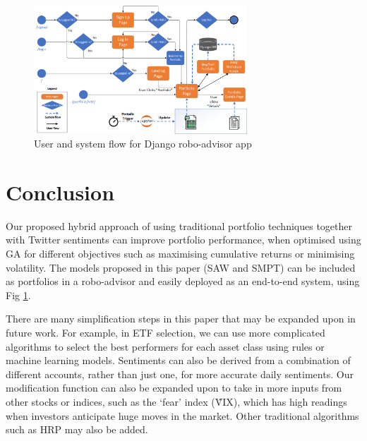 \documentclass{article}
\begin{document}
\begin{figure}[htbp]
    \includegraphics[width=8cm]{figure_django_architecture.png}
    \caption{User and system flow for Django robo-advisor app\label{figure_django}}
\end{figure}

\section{Conclusion}
\label{sec:conclusions}

Our proposed hybrid approach of using traditional portfolio techniques together with Twitter sentiments can improve portfolio performance, when optimised using GA for different objectives such as maximising cumulative returns or minimising volatility. The models proposed in this paper (SAW and SMPT) can be included as portfolios in a robo-advisor and easily deployed as an end-to-end system, using Fig \ref{figure_django}.

There are many simplification steps in this paper that may be expanded upon in future work. For example, in ETF selection, we can use more complicated algorithms to select the best performers for each asset class using rules or machine learning models. Sentiments can also be derived from a combination of different accounts, rather than just one, for more accurate daily sentiments. Our modification function can also be expanded upon to take in more inputs from other stocks or indices, such as the `fear' index (\^VIX), which has high readings when investors anticipate huge moves in the market. Other traditional algorithms such as HRP may also be added.



\end{document}
